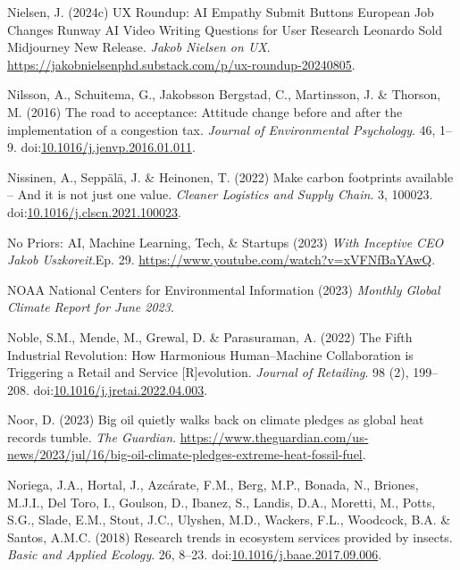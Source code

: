 \documentclass[
  letterpaper,
  DIV=11,
  numbers=noendperiod]{scrartcl}
\newlength{\cslhangindent}
\newenvironment{CSLReferences}[2] %
 {\begin{list}{}{%
  \setlength{\itemindent}{0pt}
  \setlength{\leftmargin}{0pt}
  \setlength{\parsep}{0pt}
  \ifodd #1
   \setlength{\leftmargin}{\cslhangindent}
   \setlength{\itemindent}{-1\cslhangindent}
  \fi
  \setlength{\itemsep}{#2\baselineskip}}}
 {\end{list}}
\begin{document}
\begin{CSLReferences}{0}{1}
Nielsen, J. (2024c) {UX Roundup}: {AI Empathy} {\textbar} {Submit
Buttons} {\textbar} {European Job Changes} {\textbar} {Runway AI Video}
{\textbar} {Writing Questions} for {User Research} {\textbar} {Leonardo
Sold} {\textbar} {Midjourney New Release}. \emph{Jakob Nielsen on UX}.
\url{https://jakobnielsenphd.substack.com/p/ux-roundup-20240805}.

Nilsson, A., Schuitema, G., Jakobsson Bergstad, C., Martinsson, J. \&
Thorson, M. (2016) The road to acceptance: {Attitude} change before and
after the implementation of a congestion tax. \emph{Journal of
Environmental Psychology}. 46, 1--9.
doi:\href{https://doi.org/10.1016/j.jenvp.2016.01.011}{10.1016/j.jenvp.2016.01.011}.

Nissinen, A., Seppälä, J. \& Heinonen, T. (2022) Make carbon footprints
available -- {And} it is not just one value. \emph{Cleaner Logistics and
Supply Chain}. 3, 100023.
doi:\href{https://doi.org/10.1016/j.clscn.2021.100023}{10.1016/j.clscn.2021.100023}.

No Priors: AI, Machine Learning, Tech, \& Startups (2023) \emph{With
{Inceptive CEO Jakob Uszkoreit}}.Ep. 29.
\url{https://www.youtube.com/watch?v=xVFNfBaYAwQ}.

NOAA National Centers for Environmental Information (2023) \emph{Monthly
{Global Climate Report} for {June} 2023}.

Noble, S.M., Mende, M., Grewal, D. \& Parasuraman, A. (2022) The {Fifth
Industrial Revolution}: {How Harmonious Human}--{Machine Collaboration}
is {Triggering} a {Retail} and {Service} {[}{R}{]}evolution.
\emph{Journal of Retailing}. 98 (2), 199--208.
doi:\href{https://doi.org/10.1016/j.jretai.2022.04.003}{10.1016/j.jretai.2022.04.003}.

Noor, D. (2023) Big oil quietly walks back on climate pledges as global
heat records tumble. \emph{The Guardian}.
\url{https://www.theguardian.com/us-news/2023/jul/16/big-oil-climate-pledges-extreme-heat-fossil-fuel}.

Noriega, J.A., Hortal, J., Azcárate, F.M., Berg, M.P., Bonada, N.,
Briones, M.J.I., Del Toro, I., Goulson, D., Ibanez, S., Landis, D.A.,
Moretti, M., Potts, S.G., Slade, E.M., Stout, J.C., Ulyshen, M.D.,
Wackers, F.L., Woodcock, B.A. \& Santos, A.M.C. (2018) Research trends
in ecosystem services provided by insects. \emph{Basic and Applied
Ecology}. 26, 8--23.
doi:\href{https://doi.org/10.1016/j.baae.2017.09.006}{10.1016/j.baae.2017.09.006}.


\end{CSLReferences}
\end{document}
